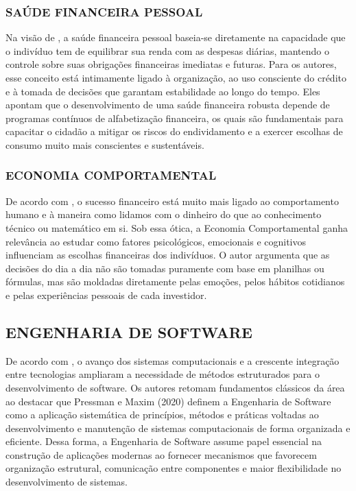 \documentclass[12pt]{article}
\begin{document}
    \subsubsection{SAÚDE FINANCEIRA PESSOAL}

      Na visão de \cite{lazaretti2024importancia}, a saúde financeira pessoal baseia-se diretamente na capacidade que o indivíduo tem de equilibrar sua renda com as despesas diárias, mantendo o controle sobre suas obrigações financeiras imediatas e futuras. Para os autores, esse conceito está intimamente ligado à organização, ao uso consciente do crédito e à tomada de decisões que garantam estabilidade ao longo do tempo. Eles apontam que o desenvolvimento de uma saúde financeira robusta depende de programas contínuos de alfabetização financeira, os quais são fundamentais para capacitar o cidadão a mitigar os riscos do endividamento e a exercer escolhas de consumo muito mais conscientes e sustentáveis.

    \subsubsection{ECONOMIA COMPORTAMENTAL}

      De acordo com \cite{housel2021psicologia}, o sucesso financeiro está muito mais ligado ao comportamento humano e à maneira como lidamos com o dinheiro do que ao conhecimento técnico ou matemático em si. Sob essa ótica, a Economia Comportamental ganha relevância ao estudar como fatores psicológicos, emocionais e cognitivos influenciam as escolhas financeiras dos indivíduos. O autor argumenta que as decisões do dia a dia não são tomadas puramente com base em planilhas ou fórmulas, mas são moldadas diretamente pelas emoções, pelos hábitos cotidianos e pelas experiências pessoais de cada investidor.

  \subsection{ENGENHARIA DE SOFTWARE}

    De acordo com \cite{ciriano2025arquitetura}, o avanço dos sistemas computacionais e a crescente integração entre tecnologias ampliaram a necessidade de métodos estruturados para o desenvolvimento de software. Os autores retomam fundamentos clássicos da área ao destacar que Pressman e Maxim (2020) definem a Engenharia de Software como a aplicação sistemática de princípios, métodos e práticas voltadas ao desenvolvimento e manutenção de sistemas computacionais de forma organizada e eficiente. Dessa forma, a Engenharia de Software assume papel essencial na construção de aplicações modernas ao fornecer mecanismos que favorecem organização estrutural, comunicação entre componentes e maior flexibilidade no desenvolvimento de sistemas.
\end{document}
